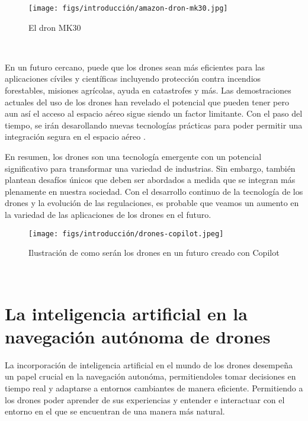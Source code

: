 \begin{figure} [H]
  \begin{center}
    \texttt{[image: figs/introducción/amazon-dron-mk30.jpg]}
  \end{center}
  \caption{El dron MK30}
  \label{fig:MK30}
\end{figure}\

En un futuro cercano, puede que los drones sean más eficientes para las aplicaciones cíviles y científicas incluyendo protección contra incendios forestables, misiones agrícolas, 
ayuda en catastrofes y más. 
Las demostraciones actuales del uso de los drones han revelado el potencial que pueden tener pero aun así el acceso al espacio aéreo sigue siendo un factor limitante. Con el paso del 
tiempo, se irán desarollando nuevas tecnologías prácticas para poder permitir una integración segura en el espacio aéreo \cite{KrejciGarzon_2014}. \newline

En resumen, los drones son una tecnología emergente con un potencial significativo para transformar una variedad de industrias. Sin embargo, también plantean desafíos
únicos que deben ser abordados a medida que se integran más plenamente en nuestra sociedad. Con el desarrollo continuo de la tecnología de los drones y la evolución de las
regulaciones, es probable que veamos un aumento en la variedad de las aplicaciones de los drones en el futuro. \newline

\begin{figure} [H]
  \begin{center}
    \texttt{[image: figs/introducción/drones-copilot.jpeg]}
  \end{center}
  \caption{Ilustración de como serán los drones en un futuro creado con Copilot}
  \label{fig:Copilot}
\end{figure}\

\newpage
\section{La inteligencia artificial en la navegación autónoma de drones}
\label{sec:IA}

La incorporación de inteligencia artificial en el mundo de los drones desempeña un papel crucial en la navegación autonóma, permitiendoles tomar decisiones en tiempo real y adaptarse 
a entornos cambiantes de manera eficiente. Permitiendo a los drones poder aprender de sus experiencias y entender e interactuar con el entorno en el que se encuentran de una manera más
natural. \newline


